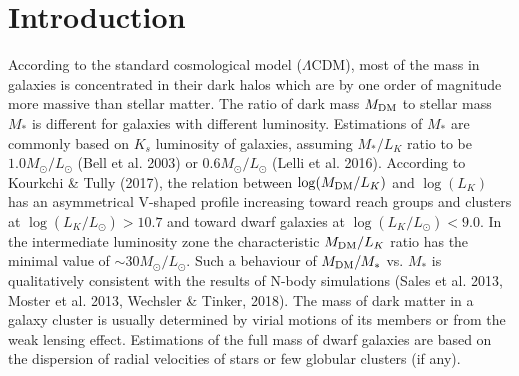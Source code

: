 \documentclass[proof]{WileyASNA-v1}
\begin{document}


\section{Introduction}\label{sec1}

According to the standard cosmological model ($\Lambda$CDM), most of the mass in
galaxies is concentrated in their dark halos which are by one order of magnitude
more massive than stellar matter. The ratio of dark mass $M_{\rm DM}$ to stellar
mass $M_*$ is different for galaxies with different luminosity. Estimations of
$M_*$ are commonly based on $K_s$ luminosity of galaxies, assuming $M_*/L_K$
ratio to be $1.0M_{\odot}/L_{\odot}$ (Bell et al. 2003) or $0.6 M_{\odot}/
L_{\odot}$ (Lelli et al. 2016). According to Kourkchi \& Tully (2017), the
relation between $\log(M_{\rm DM}/L_K)$ and $\log(L_K)$ has an asymmetrical
V-shaped profile increasing toward reach groups and clusters at $\log(L_K/
L_{\odot})>10.7$ and toward dwarf galaxies at $\log(L_K/L_{\odot}) <9.0$. In the
intermediate luminosity zone the characteristic $M_{\rm DM}/L_K$ ratio has the
minimal value of $\sim 30M_{\odot}/L_{\odot}$. Such a behaviour of $M_{\rm
DM}/M_*$ vs. $M_*$ is qualitatively consistent with the results of N-body
simulations (Sales et al. 2013, Moster et al. 2013, Wechsler \& Tinker, 2018).
The mass of dark matter in a galaxy cluster is usually determined by virial
motions of its members or from the weak lensing effect. Estimations of the full
mass of dwarf galaxies are based on the dispersion of radial velocities of stars
or few globular clusters (if any).
\end{document}
